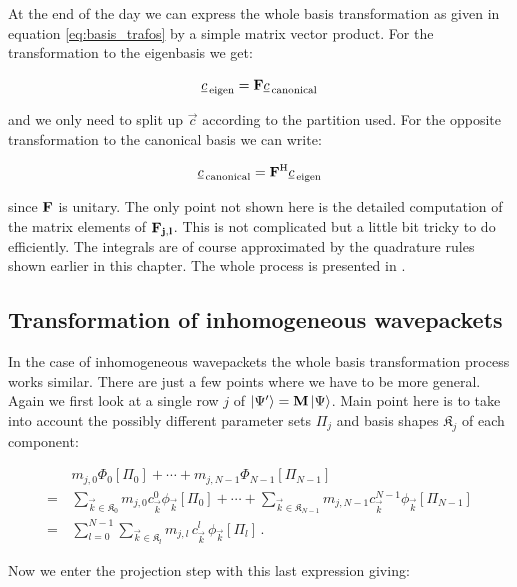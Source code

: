 At the end of the day we can express the whole basis transformation as given in
equation \eqref{eq:basis_trafos} by a simple matrix vector product. For the
transformation to the eigenbasis we get:

\begin{equation}
  \underline{c}_{\,\text{eigen}} = \mathbf{F} \underline{c}_{\,\text{canonical}}
\end{equation}

and we only need to split up $\vec{c}$ according to the partition used.
For the opposite transformation to the canonical basis we can write:

\begin{equation}
  \underline{c}_{\,\text{canonical}} = \mathbf{F}{}^{\textnormal{H}} \underline{c}_{\,\text{eigen}}
\end{equation}

since $\mathbf{F}$ is unitary. The only point not shown here is the detailed
computation of the matrix elements of $\mathbf{F_{j,l}}$. This is not complicated
but a little bit tricky to do efficiently. The integrals are of course approximated
by the quadrature rules shown earlier in this chapter. The whole process is presented
in \cite{B_bachelor_thesis}.


\subsection{Transformation of inhomogeneous wavepackets}


In the case of inhomogeneous wavepackets the whole basis transformation process
works similar. There are just a few points where we have to be more general.
Again we first look at a single row $j$ of $\Ket{\Psi^\prime} = \mathbf{M} \Ket{\Psi}$.
Main point here is to take into account the possibly different parameter sets $\Pi_j$
and basis shapes $\mathfrak{K}_j$ of each component:

\begin{align*}
       & m_{j,0} \Phi_0[\Pi_0] + \cdots + m_{j,N-1} \Phi_{N-1}[\Pi_{N-1}] \\
  = \, & \sum_{\vec{k}\in\mathfrak{K}_0} m_{j,0}  c_{\vec{k}}^0 \phi_{\vec{k}}[\Pi_0] + \cdots
         + \sum_{\vec{k}\in\mathfrak{K}_{N-1}} m_{j,N-1} c_{\vec{k}}^{N-1} \phi_{\vec{k}}[\Pi_{N-1}] \\
  = \, & \sum_{l=0}^{N-1} \sum_{\vec{k}\in\mathfrak{K}_l} m_{j,l} \, c_{\vec{k}}^l \, \phi_{\vec{k}}[\Pi_l] \,.
\end{align*}

Now we enter the projection step with this last expression giving:

